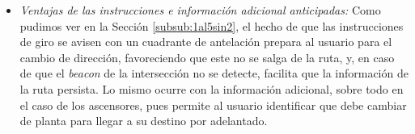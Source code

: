 \begin{itemize}
	\item \textit{Ventajas de las instrucciones e información adicional anticipadas:} Como pudimos ver en la Sección \ref{subsub:1al5sin2}, el hecho de que las instrucciones de giro se avisen con un cuadrante de antelación prepara al usuario para el cambio de dirección, favoreciendo que este no se salga de la ruta, y, en caso de que el \textit{beacon} de la intersección no se detecte, facilita que la información de la ruta persista. Lo mismo ocurre con la información adicional, sobre todo en el caso de los ascensores, pues permite al usuario identificar que debe cambiar de planta para llegar a su destino por adelantado.

\end{itemize}


